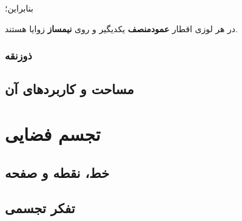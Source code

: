 \documentclass[12pt, a4paper]{book}
\begin{document}
بنابراین؛
\newline \smallskip

{\large در هر لوزی اقطار \textbf{عمودمنصف} یکدیگیر و روی \textbf{نیمساز} زوایا هستند.}

\subsection{ذوزنقه}

\section{مساحت و کاربردهای آن}

\chapter{تجسم فضایی}

\section{خط، نقطه و صفحه}

\section{تفکر تجسمی}
\end{document}
